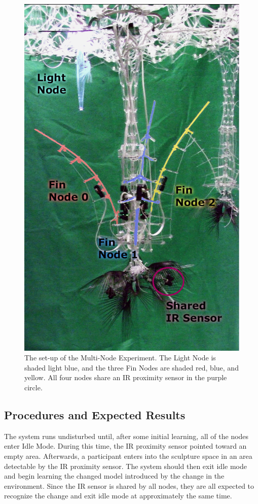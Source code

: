 \begin{figure} [!htbp]
	\centering
	\includegraphics[height=0.8\textheight]{"fig/validations/Single_Cluster Set-up"}
	\caption[Photograph of the Multi-Node Experiment set-up]{The set-up of the Multi-Node Experiment. The Light Node is shaded light blue, and the three Fin Nodes are shaded red, blue, and yellow. All four nodes share an IR proximity sensor in the purple circle.}
	\label{fig:Single_Cluster Set-up}
\end{figure}

\subsection{Procedures and Expected Results}
The system runs undisturbed until, after some initial learning, all of the nodes enter Idle Mode.  During this time, the IR proximity sensor pointed toward an empty area. Afterwards, a participant enters into the sculpture space in an area detectable by the IR proximity sensor. The system should then exit idle mode and begin learning the changed model introduced by the change in the environment.  Since the IR sensor is shared by all nodes, they are all expected to recognize the change and exit idle mode at approximately the same time. 


